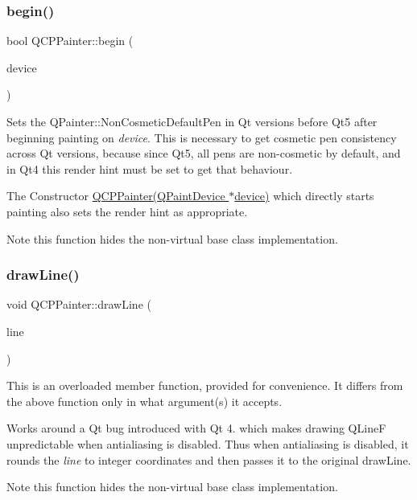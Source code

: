 \subsubsection{\texorpdfstring{begin()}{begin()}}
{\footnotesize\ttfamily bool Q\+C\+P\+Painter\+::begin (\begin{DoxyParamCaption}\item[{Q\+Paint\+Device $\ast$}]{device }\end{DoxyParamCaption})}

Sets the Q\+Painter\+::\+Non\+Cosmetic\+Default\+Pen in Qt versions before Qt5 after beginning painting on {\itshape device}. This is necessary to get cosmetic pen consistency across Qt versions, because since Qt5, all pens are non-\/cosmetic by default, and in Qt4 this render hint must be set to get that behaviour.

The Constructor \hyperlink{class_q_c_p_painter_ae58dbb1795ddc4351ab324dc9898aa22}{Q\+C\+P\+Painter(\+Q\+Paint\+Device $\ast$device)} which directly starts painting also sets the render hint as appropriate.

\begin{DoxyNote}{Note}
this function hides the non-\/virtual base class implementation. 
\end{DoxyNote}
\hypertarget{class_q_c_p_painter_a0b4b1b9bd495e182c731774dc800e6e0}{}\label{class_q_c_p_painter_a0b4b1b9bd495e182c731774dc800e6e0} 
\subsubsection{\texorpdfstring{draw\+Line()}{drawLine()}}
{\footnotesize\ttfamily void Q\+C\+P\+Painter\+::draw\+Line (\begin{DoxyParamCaption}\item[{const Q\+LineF \&}]{line }\end{DoxyParamCaption})}

This is an overloaded member function, provided for convenience. It differs from the above function only in what argument(s) it accepts.

Works around a Qt bug introduced with Qt 4. which makes drawing Q\+LineF unpredictable when antialiasing is disabled. Thus when antialiasing is disabled, it rounds the {\itshape line} to integer coordinates and then passes it to the original draw\+Line.

\begin{DoxyNote}{Note}
this function hides the non-\/virtual base class implementation. 
\end{DoxyNote}
\hypertarget{class_q_c_p_painter_a7e63fbcf47e35c6f2ecd11b8fef7c7d8}{}\label{class_q_c_p_painter_a7e63fbcf47e35c6f2ecd11b8fef7c7d8} 
